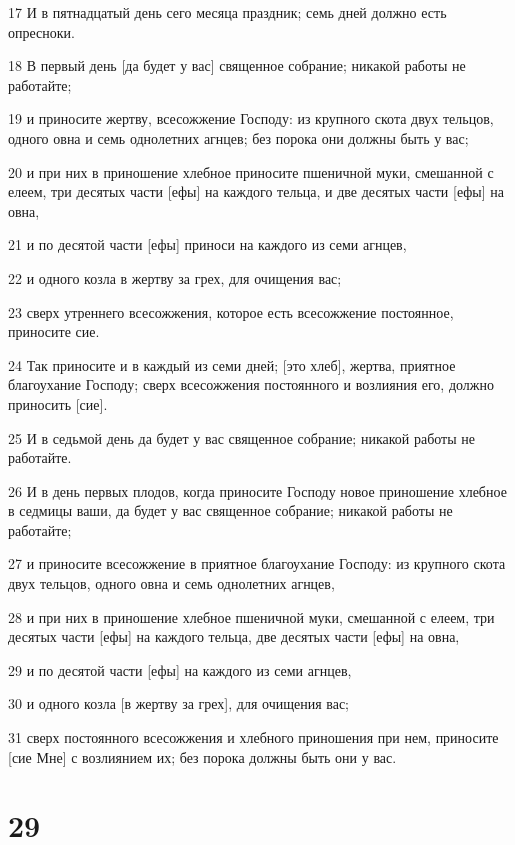 \par 17 И в пятнадцатый день сего месяца праздник; семь дней должно есть опресноки.
\par 18 В первый день [да будет у вас] священное собрание; никакой работы не работайте;
\par 19 и приносите жертву, всесожжение Господу: из крупного скота двух тельцов, одного овна и семь однолетних агнцев; без порока они должны быть у вас;
\par 20 и при них в приношение хлебное приносите пшеничной муки, смешанной с елеем, три десятых части [ефы] на каждого тельца, и две десятых части [ефы] на овна,
\par 21 и по десятой части [ефы] приноси на каждого из семи агнцев,
\par 22 и одного козла в жертву за грех, для очищения вас;
\par 23 сверх утреннего всесожжения, которое есть всесожжение постоянное, приносите сие.
\par 24 Так приносите и в каждый из семи дней; [это хлеб], жертва, приятное благоухание Господу; сверх всесожжения постоянного и возлияния его, должно приносить [сие].
\par 25 И в седьмой день да будет у вас священное собрание; никакой работы не работайте.
\par 26 И в день первых плодов, когда приносите Господу новое приношение хлебное в седмицы ваши, да будет у вас священное собрание; никакой работы не работайте;
\par 27 и приносите всесожжение в приятное благоухание Господу: из крупного скота двух тельцов, одного овна и семь однолетних агнцев,
\par 28 и при них в приношение хлебное пшеничной муки, смешанной с елеем, три десятых части [ефы] на каждого тельца, две десятых части [ефы] на овна,
\par 29 и по десятой части [ефы] на каждого из семи агнцев,
\par 30 и одного козла [в жертву за грех], для очищения вас;
\par 31 сверх постоянного всесожжения и хлебного приношения при нем, приносите [сие Мне] с возлиянием их; без порока должны быть они у вас.

\chapter{29}

